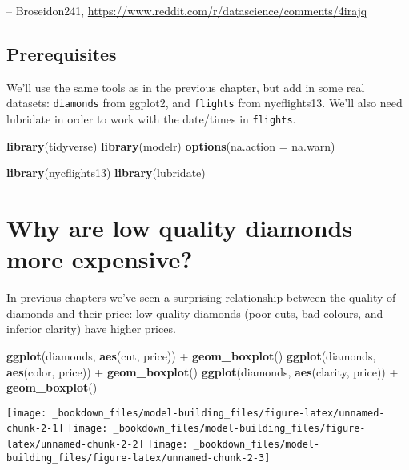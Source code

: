 \documentclass[]{book}
\newenvironment{Shaded}{\begin{snugshade}}{\end{snugshade}}
\newcommand{\KeywordTok}[1]{\textcolor[rgb]{0.13,0.29,0.53}{\textbf{{#1}}}}
\newcommand{\DataTypeTok}[1]{\textcolor[rgb]{0.13,0.29,0.53}{{#1}}}
\newcommand{\StringTok}[1]{\textcolor[rgb]{0.31,0.60,0.02}{{#1}}}
\newcommand{\NormalTok}[1]{{#1}}
\begin{document}
-- Broseidon241,
\url{https://www.reddit.com/r/datascience/comments/4irajq}

\subsection{Prerequisites}\label{prerequisites-16}

We'll use the same tools as in the previous chapter, but add in some
real datasets: \texttt{diamonds} from ggplot2, and \texttt{flights} from
nycflights13. We'll also need lubridate in order to work with the
date/times in \texttt{flights}.

\begin{Shaded}
\begin{Highlighting}[]
\KeywordTok{library}\NormalTok{(tidyverse)}
\KeywordTok{library}\NormalTok{(modelr)}
\KeywordTok{options}\NormalTok{(}\DataTypeTok{na.action =} \NormalTok{na.warn)}

\KeywordTok{library}\NormalTok{(nycflights13)}
\KeywordTok{library}\NormalTok{(lubridate)}
\end{Highlighting}
\end{Shaded}

\section{Why are low quality diamonds more
expensive?}\label{diamond-prices}

In previous chapters we've seen a surprising relationship between the
quality of diamonds and their price: low quality diamonds (poor cuts,
bad colours, and inferior clarity) have higher prices.

\begin{Shaded}
\begin{Highlighting}[]
\KeywordTok{ggplot}\NormalTok{(diamonds, }\KeywordTok{aes}\NormalTok{(cut, price)) +}\StringTok{ }\KeywordTok{geom_boxplot}\NormalTok{()}
\KeywordTok{ggplot}\NormalTok{(diamonds, }\KeywordTok{aes}\NormalTok{(color, price)) +}\StringTok{ }\KeywordTok{geom_boxplot}\NormalTok{()}
\KeywordTok{ggplot}\NormalTok{(diamonds, }\KeywordTok{aes}\NormalTok{(clarity, price)) +}\StringTok{ }\KeywordTok{geom_boxplot}\NormalTok{()}
\end{Highlighting}
\end{Shaded}

\begin{center}\texttt{[image: \_bookdown\_files/model-building\_files/figure-latex/unnamed-chunk-2-1]} \texttt{[image: \_bookdown\_files/model-building\_files/figure-latex/unnamed-chunk-2-2]} \texttt{[image: \_bookdown\_files/model-building\_files/figure-latex/unnamed-chunk-2-3]} \end{center}
\end{document}
